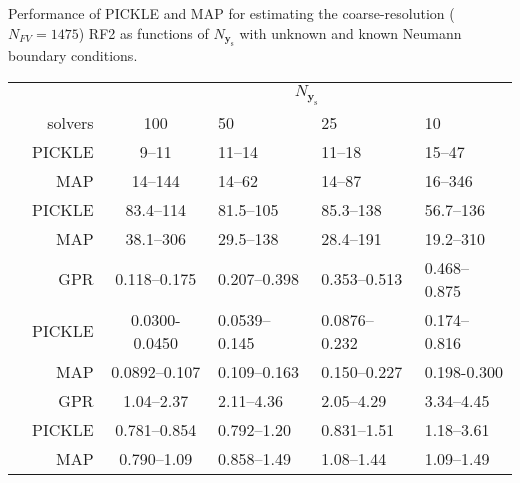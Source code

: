 \documentclass{agujournal2019}
\renewcommand{\caption}[2][]{\ignorespaces}
\begin{document}
\begin{table}[!htbp]
  \caption{Performance of PICKLE and MAP for estimating the coarse-resolution ($N_{FV}=1475$) RF2 as functions of $N_{\mathbf{y}_{\mathrm{s}}}$ with \subref{tab:RF2_1x_unknown_flux_results} unknown and \subref{tab:RF2_1x_known_flux_results} known Neumann boundary conditions.
  }
    \label{tab:RF2_1x_flux_results}
    \begin{subtable}{\textwidth}
        \caption{Unknown Neumann boundary conditions}%
        \label{tab:RF2_1x_unknown_flux_results}%
        \begin{tabu} to 
            \toprule
            & &  \\
            & solvers & 100 & 50 & 25 & 10\\
            \midrule
             & PICKLE & 9--11 & 11--14 & 11--18 & 15--47\\
            & MAP & 14--144 & 14--62 & 14--87 & 16--346 \\
            \midrule
             & PICKLE & 83.4--114 & 81.5--105 & 85.3--138 & 56.7--136 \\
            & MAP & 38.1--306 & 29.5--138 & 28.4--191 & 19.2--310 \\
            \midrule
             & GPR & 0.118--0.175 & 0.207--0.398 & 0.353--0.513 & 0.468--0.875 \\
            & PICKLE & 0.0300-0.0450 & 0.0539--0.145 & 0.0876--0.232 & 0.174--0.816 \\
            & MAP & 0.0892--0.107 & 0.109--0.163 & 0.150--0.227 & 0.198-0.300 \\
            \midrule
             & GPR & 1.04--2.37 & 2.11--4.36 & 2.05--4.29 & 3.34--4.45 \\
            & PICKLE & 0.781--0.854 & 0.792--1.20 & 0.831--1.51 & 1.18--3.61 \\
            & MAP & 0.790--1.09 & 0.858--1.49 & 1.08--1.44 & 1.09--1.49 \\
            \bottomrule
        \end{tabu}
    \end{subtable}\\

\end{table}
\end{document}
